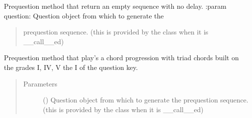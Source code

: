 \documentclass[letterpaper,10pt,english]{sphinxmanual}
\begin{document}

\begin{fulllineitems}
\label{\detokenize{birdears:birdears.prequestion.none}}
\sphinxAtStartPar
Pre\sphinxhyphen{}question method that return an empty sequence with no delay.
:param question: Question object from which to generate the
\begin{quote}

\sphinxAtStartPar
pre\sphinxhyphen{}question sequence. (this is provided by the  class
when it is {\color{red}\bfseries{}\textasciigrave{}}\_\_call\_\_\textasciigrave{}ed)
\end{quote}
\begin{quote}\begin{description}
\end{description}\end{quote}

\end{fulllineitems}


\begin{fulllineitems}
\label{\detokenize{birdears:birdears.prequestion.progression_i_iv_v_i}}
\sphinxAtStartPar
Pre\sphinxhyphen{}question method that play’s a chord progression with triad chords
built on the grades I, IV, V the I of the question key.
\begin{quote}\begin{description}
\item[{Parameters}] \leavevmode
\sphinxAtStartPar
{} () \textendash{} Question object from which to generate the
pre\sphinxhyphen{}question sequence. (this is provided by the  class
when it is {\color{red}\bfseries{}\textasciigrave{}}\_\_call\_\_\textasciigrave{}ed)

\end{description}\end{quote}

\end{fulllineitems}
\end{document}
